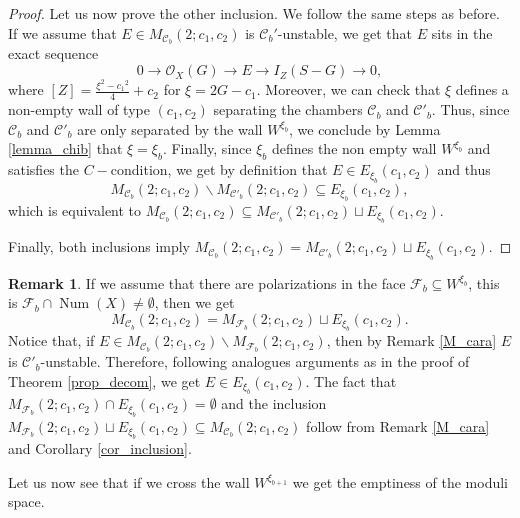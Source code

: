 \documentclass[11pt,twoside]{amsart}
\theoremstyle{definition}
\newtheorem{remark}[theorem]{Remark}
\newcommand{\Num}{\operatorname{Num}}
\begin{document}
\begin{proof}
Let us now prove the other  inclusion. We follow the same steps as before. If we assume that $E\in M_{\mathcal{C}_b}(2;c_1,c_2)$ is $\mathcal{C}_b'$-unstable, we get that $E$
sits in the exact sequence $$0\rightarrow\mathcal{O}_X(G)\rightarrow E\rightarrow I_Z(S-G)\rightarrow0,$$ where $[Z]=\frac{\xi^2-{c_1}^2}{4}+c_2$ for $\xi=2G-c_1$. %
Moreover, we can check that $\xi$ defines a non-empty wall of type $(c_1,c_2)$ separating the chambers $\mathcal{C}_b$ and $\mathcal{C}'_b$. Thus, since $\mathcal{C}_b$ and $\mathcal{C}'_b$ are only separated by the wall $W^{\xi_b}$,  we conclude by Lemma \ref{lemma_chib} that $\xi=\xi_b$.
 Finally, since $\xi_b$ defines the non empty wall $W^{\xi_b}$ and satisfies the $C-$condition, we get by definition that $E\in E_{\xi_b}(c_1,c_2)$
 and thus $$M_{\mathcal{C}_b}(2;c_1,c_2)\backslash M_{\mathcal{C}'_b}(2;c_1,c_2) \subseteq E_{\xi_b}(c_1,c_2),$$ which is equivalent to $M_{\mathcal{C}_b}(2;c_1,c_2)\subseteq M_{\mathcal{C}'_b}(2;c_1,c_2) \sqcup E_{\xi_b}(c_1,c_2).$

\noindent Finally, both inclusions imply $M_{\mathcal{C}_b}(2;c_1,c_2)= M_{\mathcal{C}'_b}(2;c_1,c_2) \sqcup E_{\xi_b}(c_1,c_2).$
\end{proof}


\begin{remark}
If we assume that there are polarizations in the face $\mathcal{F}_b\subseteq W^{\xi_b}$, this is $\mathcal{F}_b\cap\Num(X)\neq\emptyset$, then  we get $$M_{\mathcal{C}_b}(2;c_1,c_2)=M_{\mathcal{F}_b}(2;c_1,c_2)\sqcup E_{\xi_b}(c_1,c_2).$$
Notice that, if  $E\in M_{\mathcal{C}_b}(2;c_1,c_2)\backslash  M_{\mathcal{F}_b}(2;c_1,c_2)$, then by Remark \ref{M_cara} $E$ is $\mathcal{C}'_b$-unstable. Therefore, following analogues arguments as in the proof of Theorem \ref{prop_decom}, we get $E\in E_{\xi_b}(c_1,c_2)$. The fact that $M_{\mathcal{F}_b}(2;c_1,c_2)\cap E_{\xi_b}(c_1,c_2)=\emptyset$ and the  inclusion $M_{\mathcal{F}_b}(2;c_1,c_2)\sqcup E_{\xi_b}(c_1,c_2)\subseteq M_{\mathcal{C}_b}(2;c_1,c_2)$ follow from Remark \ref{M_cara} and  Corollary \ref{cor_inclusion}.
\end{remark}


Let us now see that if we cross the wall $W^{\xi_{b+1}}$ we get the emptiness of the moduli space.
\end{document}
